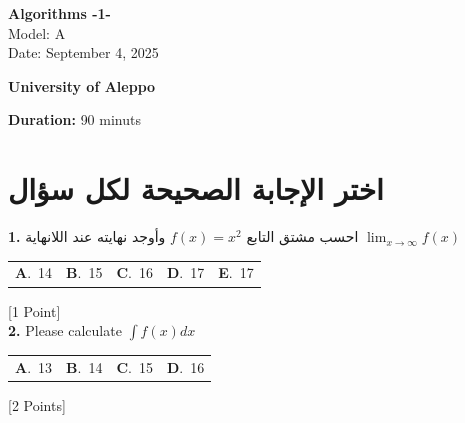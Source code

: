 \documentclass[12pt]{article}
\newcommand{\choice}[2]{\textbf{#1}.~#2}
\begin{document}
\begin{flushright}
{\Large \textbf{{\textenglish{Algorithms -1-}}}}\\[0.25em]
{\normalsize \textenglish{Model: }{\textenglish{A}}}\\[0.1em]
{\normalsize \textenglish{Date: }{\textenglish{September 4, 2025}}}
\end{flushright}

\vspace{0.6cm}

\noindent
\begin{minipage}[t]{0.65\textwidth}
  \raggedright
  \textbf{{\textenglish{University of Aleppo}}}\\[0.3em]
\end{minipage}\hfill
\begin{minipage}[t]{0.3\textwidth}
  \raggedleft
  \textenglish{\textbf{Duration: }}{\textenglish{90 minuts}}
\end{minipage}

\vspace{0.9cm}

\section*{اختر الإجابة الصحيحة لكل سؤال}

\noindent \textbf{\textenglish{1.}} {\textarabic{احسب مشتق التابع }}\( f(x) = x^2\){\textarabic{ وأوجد نهايته عند اللانهاية }}\(\lim_{x \to \infty}f(x)\)

\begin{tabularx}{\linewidth}{@{}*{5}{Y}@{}}
\choice{A}{{{\textenglish{14}}}} & \choice{B}{{{\textenglish{15}}}} & \choice{C}{{{\textenglish{16}}}} & \choice{D}{{{\textenglish{17}}}} & \choice{E}{{{\textenglish{17}}}} \\
\end{tabularx}
\hfill {\textenglish{[1 Point]}}\\[0.5em]

\noindent \textbf{\textenglish{2.}} {\textenglish{Please calculate }}\(\int f(x)dx\)

\begin{tabularx}{\linewidth}{@{}*{4}{Y}@{}}
\choice{A}{{{\textenglish{13}}}} & \choice{B}{{{\textenglish{14}}}} & \choice{C}{{{\textenglish{15}}}} & \choice{D}{{{\textenglish{16}}}} \\
\end{tabularx}
\hfill {\textenglish{[2 Points]}}\\[0.5em]
\end{document}
